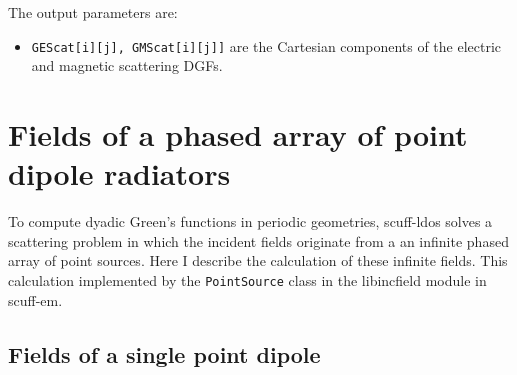 \documentclass[letterpaper]{article}
\begin{document}
The output parameters are:

\begin{itemize}
 \item \texttt{GEScat[i][j], GMScat[i][j]]} are the Cartesian components of the 
       electric and magnetic scattering DGFs.
\end{itemize}

\appendix
\newpage 
\section{Fields of a phased array of point dipole radiators}
\label{DipoleFieldsAppendix}

To compute dyadic Green's functions in periodic geometries,
{\sc scuff-ldos} solves a scattering problem in which the
incident fields originate from a an infinite phased array
of point sources. Here I describe the calculation of these
infinite fields. This calculation implemented by the 
\texttt{PointSource} 
class in the {\sc libincfield} module in {\sc scuff-em}.

\subsection*{Fields of a single point dipole}
\end{document}
